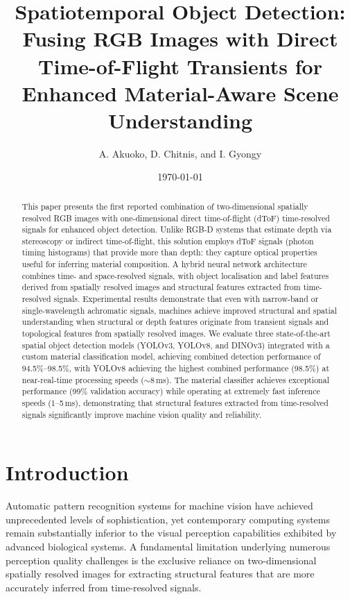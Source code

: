 \documentclass[10pt,twocolumn]{article}
\title{Spatiotemporal Object Detection: Fusing RGB Images with Direct Time-of-Flight Transients for Enhanced Material-Aware Scene Understanding}
\author{A. Akuoko, D. Chitnis, and I. Gyongy}
\date{\today}
\begin{document}
\maketitle

\begin{abstract}
This paper presents the first reported combination of two-dimensional spatially resolved RGB images with one-dimensional direct time-of-flight (dToF) time-resolved signals for enhanced object detection. Unlike RGB-D systems that estimate depth via stereoscopy or indirect time-of-flight, this solution employs dToF signals (photon timing histograms) that provide more than depth: they capture optical properties useful for inferring material composition. A hybrid neural network architecture combines time- and space-resolved signals, with object localisation and label features derived from spatially resolved images and structural features extracted from time-resolved signals. Experimental results demonstrate that even with narrow-band or single-wavelength achromatic signals, machines achieve improved structural and spatial understanding when structural or depth features originate from transient signals and topological features from spatially resolved images. We evaluate three state-of-the-art spatial object detection models (YOLOv3, YOLOv8, and DINOv3) integrated with a custom material classification model, achieving combined detection performance of 94.5\%--98.5\%, with YOLOv8 achieving the highest combined performance (98.5\%) at near-real-time processing speeds ($\sim$8\,ms). The material classifier achieves exceptional performance (99\% validation accuracy) while operating at extremely fast inference speeds (1--5\,ms), demonstrating that structural features extracted from time-resolved signals significantly improve machine vision quality and reliability.
\end{abstract}

\section{Introduction}

Automatic pattern recognition systems for machine vision have achieved unprecedented levels of sophistication, yet contemporary computing systems remain substantially inferior to the visual perception capabilities exhibited by advanced biological systems. A fundamental limitation underlying numerous perception quality challenges is the exclusive reliance on two-dimensional spatially resolved images for extracting structural features that are more accurately inferred from time-resolved signals.
\end{document}

